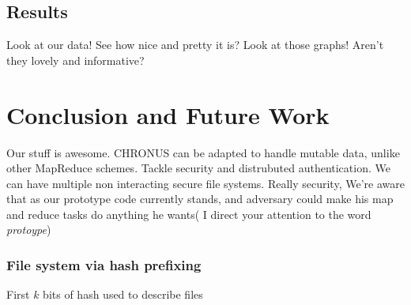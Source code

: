 \documentclass[conference, compsocconf, letterpaper]{IEEEtran}
\begin{document}
\subsection{Results}
Look at our data! See how nice and pretty it is?  Look at those graphs!  Aren't they lovely and informative? 


\section{Conclusion and Future Work}
Our stuff \cite{code} is awesome.
CHRONUS can be adapted to handle mutable data, unlike other MapReduce schemes.
Tackle security and distrubuted authentication.
We can have multiple non interacting secure file systems.
Really security,  We're aware that as our prototype code currently stands, and adversary could make his map and reduce tasks do anything he wants(   I direct your attention to the word \emph{protoype})


\subsubsection{File system via hash prefixing}
First $k$ bits of hash used to describe files




\end{document}

